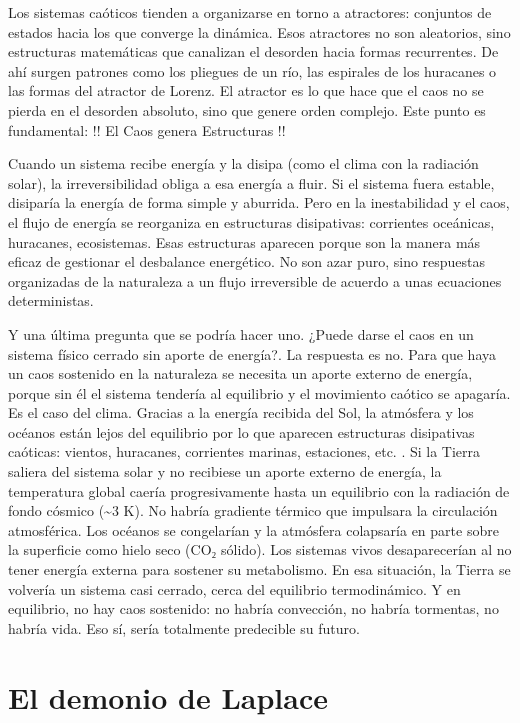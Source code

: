 \documentclass[
  11pt,
  a4paper,
  DIV=11,
  numbers=noendperiod]{scrreprt}
\begin{document}
Los sistemas caóticos tienden a organizarse en torno a atractores:
conjuntos de estados hacia los que converge la dinámica. Esos atractores
no son aleatorios, sino estructuras matemáticas que canalizan el
desorden hacia formas recurrentes. De ahí surgen patrones como los
pliegues de un río, las espirales de los huracanes o las formas del
atractor de Lorenz. El atractor es lo que hace que el caos no se pierda
en el desorden absoluto, sino que genere orden complejo. Este punto es
fundamental: !! El Caos genera Estructuras !!

Cuando un sistema recibe energía y la disipa (como el clima con la
radiación solar), la irreversibilidad obliga a esa energía a fluir. Si
el sistema fuera estable, disiparía la energía de forma simple y
aburrida. Pero en la inestabilidad y el caos, el flujo de energía se
reorganiza en estructuras disipativas: corrientes oceánicas, huracanes,
ecosistemas. Esas estructuras aparecen porque son la manera más eficaz
de gestionar el desbalance energético. No son azar puro, sino respuestas
organizadas de la naturaleza a un flujo irreversible de acuerdo a unas
ecuaciones deterministas.

Y una última pregunta que se podría hacer uno. ¿Puede darse el caos en
un sistema físico cerrado sin aporte de energía?. La respuesta es no.
Para que haya un caos sostenido en la naturaleza se necesita un aporte
externo de energía, porque sin él el sistema tendería al equilibrio y el
movimiento caótico se apagaría. Es el caso del clima. Gracias a la
energía recibida del Sol, la atmósfera y los océanos están lejos del
equilibrio por lo que aparecen estructuras disipativas caóticas:
vientos, huracanes, corrientes marinas, estaciones, etc. . Si la Tierra
saliera del sistema solar y no recibiese un aporte externo de energía,
la temperatura global caería progresivamente hasta un equilibrio con la
radiación de fondo cósmico (\textasciitilde3 K). No habría gradiente
térmico que impulsara la circulación atmosférica. Los océanos se
congelarían y la atmósfera colapsaría en parte sobre la superficie como
hielo seco (CO₂ sólido). Los sistemas vivos desaparecerían al no tener
energía externa para sostener su metabolismo. En esa situación, la
Tierra se volvería un sistema casi cerrado, cerca del equilibrio
termodinámico. Y en equilibrio, no hay caos sostenido: no habría
convección, no habría tormentas, no habría vida. Eso sí, sería
totalmente predecible su futuro.

\chapter{El demonio de Laplace}\label{el-demonio-de-laplace}
\end{document}

